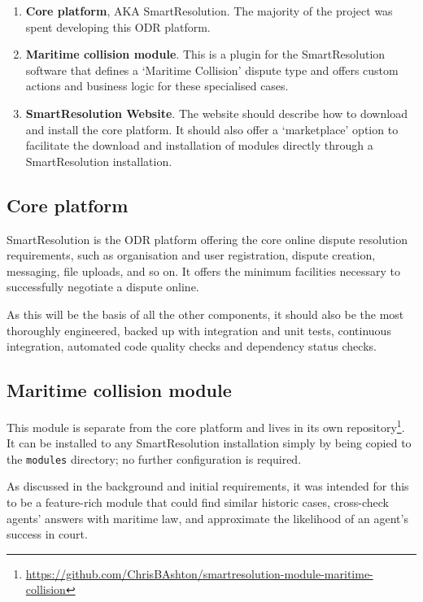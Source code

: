 \begin{enumerate}
    \item \textbf{Core platform}, AKA SmartResolution. The majority of the project was spent developing this ODR platform.
    
    \item \textbf{Maritime collision module}. This is a plugin for the SmartResolution software that defines a `Maritime Collision' dispute type and offers custom actions and business logic for these specialised cases.
    
    \item \textbf{SmartResolution Website}. The website should describe how to download and install the core platform. It should also offer a `marketplace' option to facilitate the download and installation of modules directly through a SmartResolution installation.
\end{enumerate}

\subsection{Core platform}

SmartResolution is the ODR platform offering the core online dispute resolution requirements, such as organisation and user registration, dispute creation, messaging, file uploads, and so on. It offers the minimum facilities necessary to successfully negotiate a dispute online.

As this will be the basis of all the other components, it should also be the most thoroughly engineered, backed up with integration and unit tests, continuous integration, automated code quality checks and dependency status checks.

\subsection{Maritime collision module}

This module is separate from the core platform and lives in its own repository\footnote{\url{https://github.com/ChrisBAshton/smartresolution-module-maritime-collision}}. It can be installed to any SmartResolution installation simply by being copied to the \lstinline{modules} directory; no further configuration is required.

As discussed in the background and initial requirements, it was intended for this to be a feature-rich module that could find similar historic cases, cross-check agents' answers with maritime law, and approximate the likelihood of an agent's success in court.


